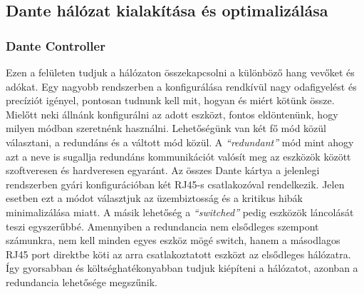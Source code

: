 





\subsection{Dante hálózat kialakítása és optimalizálása}
\subsubsection{Dante Controller}
Ezen a felületen tudjuk a hálózaton összekapcsolni a különböző hang vevőket és
adókat. Egy nagyobb rendszerben a konfigurálása rendkívül nagy odafigyelést és
precíziót igényel, pontosan tudnunk kell mit, hogyan és miért kötünk össze.
Mielőtt neki állnánk konfigurálni az adott eszközt, fontos eldöntenünk, hogy
milyen módban szeretnénk használni.
Lehetőségünk van két fő mód közül választani, a redundáns és a
váltott mód közül. A \textit{``redundant''} mód mint ahogy azt a neve is sugallja
redundáns kommunikációt valósít meg az eszközök között szoftveresen és
hardveresen egyaránt. Az összes Dante kártya a jelenlegi rendszerben gyári konfigurációban két RJ45-s
csatlakozóval rendelkezik. Jelen esetben ezt a módot választjuk az
üzembiztosság és a kritikus hibák minimalizálása miatt.
A másik lehetőség a \textit{``switched''} pedig eszközök láncolását
teszi egyszerűbbé. Amennyiben a redundancia nem elsődleges szempont számunkra, nem kell
minden egyes eszköz mögé switch, hanem a másodlagos RJ45 port direktbe köti
az arra csatlakoztatott eszközt az elsődleges hálózatra. Így gyorsabban és
költséghatékonyabban tudjuk kiépíteni a hálózatot, azonban a redundancia lehetősége megszűnik.
